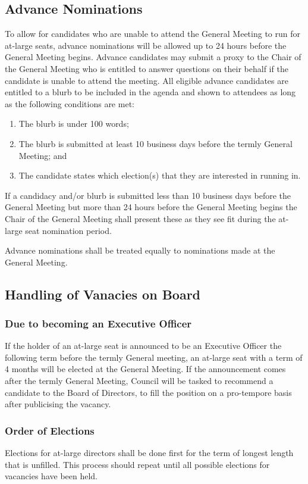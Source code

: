 \subsection{Advance Nominations}
To allow for candidates who are unable to attend the General Meeting to run for at-large seats, advance nominations will be allowed up to 24 hours before the General Meeting begins. 
Advance candidates may submit a proxy to the Chair of the General Meeting who is entitled to answer questions on their behalf if the candidate is unable to attend the meeting. 
All eligible advance candidates are entitled to a blurb to be included in the agenda and shown to attendees  as long as the following conditions are met: 
\begin{enumerate}
    \item The blurb is under 100 words; 
    \item The blurb is submitted at least 10 business days before the termly General Meeting; and
    \item The candidate states which election(s) that they are interested in running in.
\end{enumerate}
If a candidacy and/or blurb is submitted less than 10 business days before the General Meeting but more than 24 hours before the General Meeting begins the Chair of the General Meeting shall present these as they see fit during the at-large seat nomination period. 

\noindent Advance nominations shall be treated equally to nominations made at the General Meeting. 

\subsection{Handling of Vanacies on Board}
\subsubsection{Due to becoming an Executive Officer}
If the holder of an at-large seat is announced to be an Executive Officer the following term before the termly General meeting, an at-large seat with a term of 4 months will be elected at the General Meeting. 
If the announcement comes after the termly General Meeting, Council will be tasked to recommend a candidate to the Board of Directors, to fill the position on a pro-tempore basis after publicising the vacancy.

\subsubsection{Order of Elections}
Elections for at-large directors shall be done first for the term of longest length that is unfilled. 
This process should repeat until all possible elections for vacancies have been held. 


